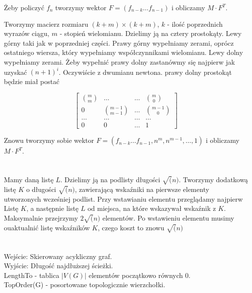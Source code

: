 \documentclass[svgnames]{report}
\begin{document}
Żeby policzyć $f_n$ tworzymy wektor $F = (f_{n-k} \ldots f_{n-1})$ i obliczamy $M\cdot F^T$.\newline


Tworzymy macierz rozmiaru $(k+m) \times (k+m)$, $k$ - ilość poprzednich wyrazów ciągu, $m$ - stopień wielomianu.
Dzielimy ją na cztery prostokąty. Lewy górny taki jak w poprzedniej części. Prawy górny wypełniamy zerami, oprócz ostatniego wiersza, który wypełniamy współczynnikami wielomianu. Lewy dolny wypełniamy zerami. Żeby wypełnić prawy dolny zastanówmy się najpierw jak uzyskać $(n+1)^i$. Oczywiście z dwumianu newtona. prawy dolny prostokąt będzie miał postać

\[
 \left[
 	\begin{array}{cccc}
 	{m \choose m}	&	\ldots				&	\ldots	& 	{m \choose 0}\\
 	0 				&	{m-1\choose m-1}	&	\ldots	&	{m-1 \choose 0}\\
 	\ldots			& 	\ldots 				& 	\ldots	& 	\ldots\\
 	0				&	0					&	\ldots	&	1
 	\end{array}
 \right]
\]


Znowu tworzymy sobie wektor $F = (f_{n-k} \ldots f_{n-1}, n^m, n^{m-1}, \dots, 1)$ i obliczamy $M\cdot F^T$.

\section{}


\section{}

Mamy daną listę $L$. Dzielimy ją na podlisty długości $\sqrt(n)$. Tworzymy dodatkową listę $K$ o długości $\sqrt(n)$, zawierającą wskaźniki na pierwsze elementy utworzonych wcześniej podlist. Przy wstawianiu elementu przeglądamy najpierw Listę $K$, a następnie listę $L$ od miejsca, na które wskazywał wskaźnik z $K$. Maksymalnie przejrzymy $2\sqrt(n)$ elementów. Po wstawieniu elementu musimy ouaktualnić listę wskaźników $K$, czego koszt to znowu $\sqrt(n)$

\section{}

Wejście: Skierowany acykliczny graf.\\
Wyjście: Długość najdłuższej ścieżki.\\
LengthTo - tablica $|V(G)|$ elementów początkowo równych 0.\\
TopOrder(G) - posortowane topologicznie wierzchołki.\\
\end{document}
